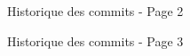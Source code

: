 \documentclass [a4 paper,11pt]{report}
\begin{document}
\begin{center}
  \begin{figure}[h!]
  \noindent{}
  \caption{Historique des commits - Page 2}
  \end{figure}

  \begin{figure}[h!]
  \noindent{}
  \caption{Historique des commits - Page 3}
  \end{figure}


\end{center}
\end{document}
